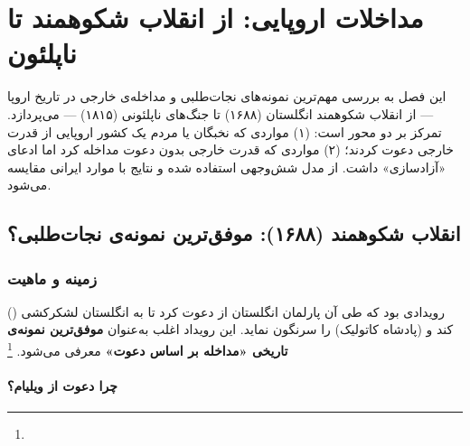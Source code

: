 \chapter{مداخلات اروپایی: از انقلاب شکوهمند تا ناپلئون}
\label{ch:european}

\begin{tcolorbox}[mybox, title={چکیده‌ی فصل}]
این فصل به بررسی مهم‌ترین نمونه‌های نجات‌طلبی و مداخله‌ی خارجی در تاریخ اروپا — از انقلاب شکوهمند انگلستان (۱۶۸۸) تا جنگ‌های ناپلئونی (۱۸۱۵) — می‌پردازد. تمرکز بر دو محور است: (۱) مواردی که نخبگان یا مردم یک کشور اروپایی از قدرت خارجی دعوت کردند؛ (۲) مواردی که قدرت خارجی بدون دعوت مداخله کرد اما ادعای «آزادسازی» داشت. از مدل شش‌وجهی استفاده شده و نتایج با موارد ایرانی مقایسه می‌شود.
\end{tcolorbox}

\section{انقلاب شکوهمند (۱۶۸۸): موفق‌ترین نمونه‌ی نجات‌طلبی؟}
\label{sec:ch08-glorious}

\subsection{زمینه و ماهیت}
\label{subsec:ch08-glorious-background}

 () رویدادی بود که طی آن پارلمان انگلستان از  دعوت کرد تا به انگلستان لشکرکشی کند و  (پادشاه کاتولیک) را سرنگون نماید. این رویداد اغلب به‌عنوان \textbf{موفق‌ترین نمونه‌ی تاریخی «مداخله بر اساس دعوت»} معرفی می‌شود.%
\footnote{}

\subsubsection{چرا دعوت از ویلیام؟}

